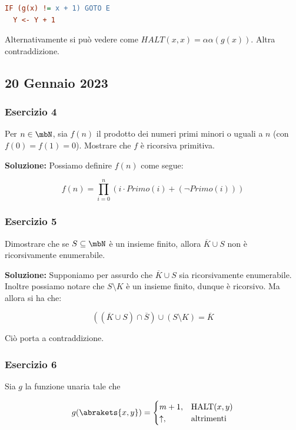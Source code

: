 \begin{lstlisting}[language=ini, caption={ }]
  IF (g(x) != x + 1) GOTO E
  Y <- Y + 1
\end{lstlisting}

Alternativamente si può vedere come \(HALT(x,x) = \alpha\alpha(g(x))\). Altra contraddizione.

\subsection{20 Gennaio 2023}

\subsubsection{Esercizio 4}

Per \(n\in \mbN\), sia \(f(n)\) il prodotto dei numeri primi minori o uguali a \(n\) (con \(f(0)=f(1)=0\)). Mostrare che \(f\) è ricorsiva primitiva.

\textbf{Soluzione: } Possiamo definire \(f(n)\) come segue:

\begin{equation}
  f(n) = \prod_{i=0}^{n} (i \cdot Primo(i) +  (\neg Primo(i)))
\end{equation}

\subsubsection{Esercizio 5}

Dimostrare che se \(S \subseteq \mbN\) è un insieme finito, allora \(\overline{K} \cup S\) non è ricorsivamente enumerabile.

\textbf{Soluzione: } Supponiamo per assurdo che \(\overline{K} \cup S\) sia ricorsivamente enumerabile. Inoltre possiamo notare che \(S \setminus K\) è un insieme finito, dunque è ricorsivo. Ma allora si ha che:

\begin{equation}
  ((\overline{K} \cup S) \cap \overline{S} )\cup (S \setminus K) = \overline{K}
\end{equation}

Ciò porta a contraddizione.

\subsubsection{Esercizio 6}

Sia \(g\) la funzione unaria tale che

\begin{equation}
  g(\abrakets{x,y}) = \begin{cases}
    m+1, & \text{HALT}(x,y)\\
    \uparrow, & \text{altrimenti}
  \end{cases}
\end{equation}

